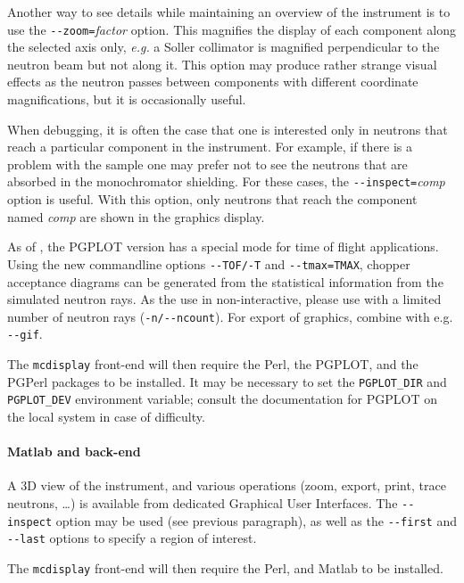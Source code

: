 Another way to see details while maintaining an overview of the instrument is to
use the \verb+--zoom=+\textit{factor} option. This magnifies the display of each
component along the selected axis only, {\em e.g.} a Soller collimator is
magnified perpendicular to the neutron beam but not along it. This option may
produce rather strange visual effects as the neutron passes between components
with different coordinate magnifications, but it is occasionally useful.

When debugging, it is often the case that one is interested only in neutrons
that reach a particular component in the instrument. For example, if there is a
problem with the sample one may prefer not to see the neutrons that are absorbed
in the monochromator shielding. For these cases, the
\verb+--inspect=+\textit{comp\/} option is useful. With this option, only
neutrons that reach the component named \textit{comp\/} are shown in the
graphics display.

As of , the PGPLOT version has a special mode for time of flight
applications. Using the new commandline options \verb+--TOF/-T+ and
\verb+--tmax=TMAX+, chopper acceptance diagrams can be generated from the
statistical information from the simulated neutron rays. As the use in
non-interactive, please use with a limited number of neutron rays
(\verb+-n/--ncount+). For export of graphics, combine with e.g. \verb+--gif+.

The \verb+mcdisplay+ front-end will then require the Perl,
the PGPLOT, and the PGPerl packages to be installed. It may be necessary to set
the \verb+PGPLOT_DIR+ and \verb+PGPLOT_DEV+ environment variable; consult the
documentation for PGPLOT on the local system in case of difficulty.

\paragraph{Matlab and back-end}

A 3D view of the instrument, and various operations (zoom, export, print, trace
neutrons, \ldots) is available from dedicated Graphical User Interfaces.  The
\verb+--inspect+ option may be used (see previous paragraph), as well as the
\verb+--first+ and \verb+--last+ options to specify a region of interest.

The \verb+mcdisplay+ front-end will then require the Perl, and
Matlab to be installed. 

